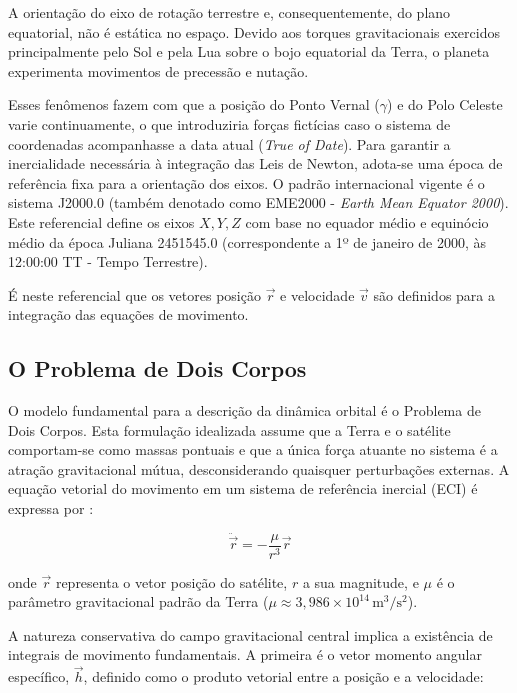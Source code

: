 A orientação do eixo de rotação terrestre e, consequentemente, do plano equatorial, não é estática no espaço. Devido aos torques gravitacionais exercidos principalmente pelo Sol e pela Lua sobre o bojo equatorial da Terra, o planeta experimenta movimentos de precessão e nutação.

Esses fenômenos fazem com que a posição do Ponto Vernal ($\gamma$) e do Polo Celeste varie continuamente, o que introduziria forças fictícias caso o sistema de coordenadas acompanhasse a data atual (\textit{True of Date}). Para garantir a inercialidade necessária à integração das Leis de Newton, adota-se uma época de referência fixa para a orientação dos eixos. O padrão internacional vigente é o sistema J2000.0 (também denotado como EME2000 - \textit{Earth Mean Equator 2000}). Este referencial define os eixos $X, Y, Z$ com base no equador médio e equinócio médio da época Juliana 2451545.0 (correspondente a 1º de janeiro de 2000, às 12:00:00 TT - Tempo Terrestre).

É neste referencial que os vetores posição $\vec{r}$ e velocidade $\vec{v}$ são definidos para a integração das equações de movimento.

\subsection{O Problema de Dois Corpos}
\label{subsec:dois_corpos}

O modelo fundamental para a descrição da dinâmica orbital é o Problema de Dois Corpos. Esta formulação idealizada assume que a Terra e o satélite comportam-se como massas pontuais e que a única força atuante no sistema é a atração gravitacional mútua, desconsiderando quaisquer perturbações externas. A equação vetorial do movimento em um sistema de referência inercial (ECI) é expressa por \cite{Bate1971, Vallado2013}:

\begin{equation}
    \ddot{\vec{r}} = -\frac{\mu}{r^3}\vec{r}
    \label{eq:dois_corpos}
\end{equation}

onde $\vec{r}$ representa o vetor posição do satélite, $r$ a sua magnitude, e $\mu$ é o parâmetro gravitacional padrão da Terra ($\mu \approx 3,986 \times 10^{14} \, \text{m}^3/\text{s}^2$).

A natureza conservativa do campo gravitacional central implica a existência de integrais de movimento fundamentais. A primeira é o vetor momento angular específico, $\vec{h}$, definido como o produto vetorial entre a posição e a velocidade:

